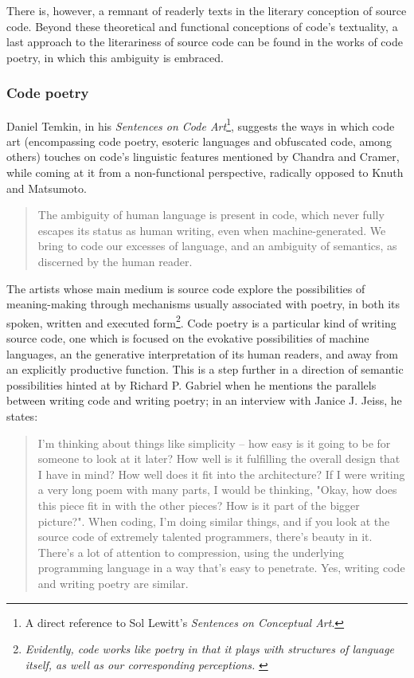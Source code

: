 There is, however, a remnant of readerly texts in the literary conception of source code. Beyond these theoretical and functional conceptions of code's textuality, a last approach to the literariness of source code can be found in the works of code poetry, in which this ambiguity is embraced.

\subsubsection{Code poetry}
\label{subsubsec:code-poetry}

Daniel Temkin, in his \emph{Sentences on Code Art}\footnote{A direct reference to Sol Lewitt's \emph{Sentences on Conceptual Art}.}, suggests the ways in which code art (encompassing code poetry, esoteric languages and obfuscated code, among others) touches on code's linguistic features mentioned by Chandra and Cramer, while coming at it from a non-functional perspective, radically opposed to Knuth and Matsumoto.

\begin{quote}
  The ambiguity of human language is present in code, which never fully escapes its status as human writing, even when machine-generated. We bring to code our excesses of language, and an ambiguity of semantics, as discerned by the human reader. \citep{temkin_sentences_2017}
\end{quote}

The artists whose main medium is source code explore the possibilities of meaning-making through mechanisms usually associated with poetry, in both its spoken, written and executed form\footnote{\emph{Evidently, code works like poetry in that it plays with structures of language itself, as well as our corresponding perceptions.} \citep{cox_aesthetics_2011}}. Code poetry is a particular kind of writing source code, one which is focused on the evokative possibilities of machine languages, an the generative interpretation of its human readers, and away from an explicitly productive function. This is a step further in a direction of semantic possibilities hinted at by Richard P. Gabriel when he mentions the parallels between writing code and writing poetry; in an interview with Janice J. Jeiss, he states:

\begin{quote}
  I'm thinking about things like simplicity -- how easy is it going to be for someone to look at it later? How well is it fulfilling the overall design that I have in mind? How well does it fit into the architecture? If I were writing a very long poem with many parts, I would be thinking, "Okay, how does this piece fit in with the other pieces? How is it part of the bigger picture?". When coding, I'm doing similar things, and if you look at the source code of extremely talented programmers, there's beauty in it. There's a lot of attention to compression, using the underlying programming language in a way that's easy to penetrate. Yes, writing code and writing poetry are similar.  \citep{jeiss_poetry_2002}
\end{quote}

